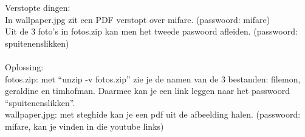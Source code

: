 Verstopte dingen:\\
In wallpaper.jpg zit een PDF verstopt over mifare. (passwoord: mifare)\\
Uit de 3 foto's in fotos.zip kan men het tweede paswoord afleiden. (passwoord: spuitenenslikken)\\\\

Oplossing:\\
fotos.zip: met “unzip -v fotos.zip” zie je de namen van de 3 bestanden: filemon, geraldine en timhofman. Daarmee kan je een link leggen naar het passwoord “spuitenenslikken”.\\
wallpaper.jpg: met steghide kan je een pdf uit de afbeelding halen. (passwoord: mifare, kan je vinden in die youtube links)

